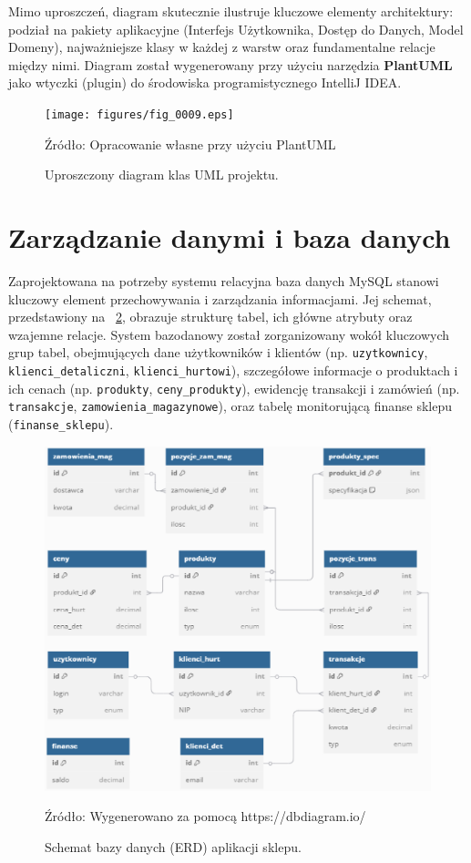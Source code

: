 Mimo uproszczeń, diagram skutecznie ilustruje kluczowe elementy architektury: podział na pakiety aplikacyjne (Interfejs Użytkownika, Dostęp do Danych, Model Domeny), najważniejsze klasy w każdej z warstw oraz fundamentalne relacje między nimi. Diagram został wygenerowany przy użyciu narzędzia \textbf{PlantUML} jako wtyczki (plugin) do środowiska programistycznego IntelliJ IDEA.

\begin{figure}[H]
    \centering
    \texttt{[image: figures/fig\_0009.eps]}
    \caption{Uproszczony diagram klas UML projektu.}
    \label{fig:uml_diagram}
    \small{Źródło: Opracowanie własne przy użyciu PlantUML}
\end{figure}
\clearpage


\section{Zarządzanie danymi i baza danych}
\label{sec:baza_danych_nowe}
Zaprojektowana na potrzeby systemu relacyjna baza danych MySQL stanowi kluczowy element przechowywania i zarządzania informacjami. Jej schemat, przedstawiony na \figurename~\ref{fig:erd_diagram}, obrazuje strukturę tabel, ich główne atrybuty oraz wzajemne relacje. System bazodanowy został zorganizowany wokół kluczowych grup tabel, obejmujących dane użytkowników i klientów (np. \texttt{uzytkownicy}, \texttt{klienci\_detaliczni}, \texttt{klienci\_hurtowi}), szczegółowe informacje o produktach i ich cenach (np. \texttt{produkty}, \texttt{ceny\_produkty}), ewidencję transakcji i zamówień (np. \texttt{transakcje}, \texttt{zamowienia\_magazynowe}), oraz tabelę monitorującą finanse sklepu (\texttt{finanse\_sklepu}).
\begin{figure}[H]
    \centering
    \includegraphics[width=\linewidth]{figures/fig_0001.eps}
    \caption{Schemat bazy danych (ERD) aplikacji sklepu.}
    \label{fig:erd_diagram}
    \small{Źródło: Wygenerowano za pomocą https://dbdiagram.io/}
\end{figure}
\clearpage

